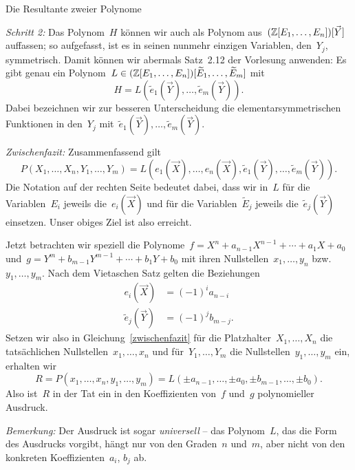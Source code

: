 \documentclass{algblatt}
\begin{document}
\begin{aufgabe}{Die Resultante zweier Polynome}
\begin{loesungE}
\emph{Schritt 2:} Das Polynom~$H$ können wir auch als Polynom
aus~$(\mathbb{Z}[E_1,\ldots,E_n])[\vec Y]$ auffassen; so aufgefasst, ist es in
seinen nunmehr einzigen Variablen, den~$Y_j$, symmetrisch. Damit können wir
abermals Satz~2.12 der Vorlesung
anwenden: Es gibt genau ein Polynom~$L \in
(\mathbb{Z}[E_1,\ldots,E_n])[\widetilde E_1,\ldots,\widetilde E_m]$ mit
\[ H = L(\widetilde e_1(\vec Y), \ldots, \widetilde e_m(\vec Y)). \]
Dabei bezeichnen wir zur besseren Unterscheidung die elementarsymmetrischen
Funktionen in den~$Y_j$ mit~$\widetilde e_1(\vec Y), \ldots, \widetilde e_m(\vec Y)$.

\emph{Zwischenfazit:} Zusammenfassend gilt
\begin{equation}\label{zwischenfazit}
  P(X_1,\ldots,X_n, Y_1,\ldots,Y_m) =
  L(e_1(\vec X),\ldots,e_n(\vec X), \widetilde e_1(\vec Y),\ldots,\widetilde e_m(\vec Y)).
\end{equation}
Die Notation auf der rechten Seite bedeutet dabei, dass wir in~$L$ für die
Variablen~$E_i$ jeweils die~$e_i(\vec X)$ und für die Variablen~$\widetilde E_j$ jeweils
die~$\widetilde e_j(\vec Y)$ einsetzen. Unser obiges Ziel ist also erreicht.

Jetzt betrachten wir speziell die Polynome~$f = X^n + a_{n-1}X^{n-1} + \cdots +
a_1X + a_0$ und~$g = Y^m + b_{m-1}Y^{m-1} + \cdots + b_1Y + b_0$ mit ihren
Nullstellen~$x_1,\ldots,y_n$ bzw.~$y_1,\ldots,y_m$. Nach dem Vietaschen Satz
gelten die Beziehungen
\begin{align*}
  e_i(\vec X) &= (-1)^i a_{n-i} \\
  \widetilde e_j(\vec Y) &= (-1)^j b_{m-j}.
\end{align*}
Setzen wir also in Gleichung~\eqref{zwischenfazit} für die Platzhalter~$X_1,\ldots,X_n$ die
tatsächlichen Nullstellen~$x_1,\ldots,x_n$ und für~$Y_1,\ldots,Y_m$ die
Nullstellen~$y_1,\ldots,y_m$ ein, erhalten wir
\[ R = P(x_1,\ldots,x_n,y_1,\ldots,y_m) =
  L(\pm a_{n-1},\ldots,\pm a_0, \pm b_{m-1},\ldots,\pm b_0). \]
Also ist~$R$ in der Tat ein in den Koeffizienten von~$f$ und~$g$ polynomieller
Ausdruck.

\emph{Bemerkung:} Der Ausdruck ist sogar \emph{universell} -- das Polynom~$L$,
das die Form des Ausdrucks vorgibt, hängt nur von den Graden~$n$ und~$m$, aber
nicht von den konkreten Koeffizienten~$a_i$, $b_j$ ab.


\end{loesungE}
\end{aufgabe}
\end{document}
